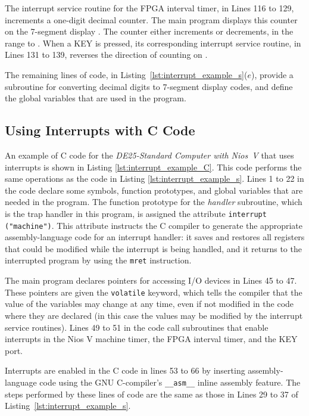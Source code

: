 \documentclass[11pt, twoside, pdftex]{article}
\newcommand{\systemNameFull}{DE25-Standard Computer with Nios~V}
\begin{document}
The interrupt service routine for the FPGA interval timer, in Lines 116 to 129,
increments a one-digit decimal counter. The main program displays this counter on the 
7-segment display . The counter either increments or decrements,
in the range  to .  When a KEY is pressed, its corresponding 
interrupt service routine, in Lines 131 to 139, reverses the direction of counting on . 

The remaining lines of code, in Listing~\ref{lst:interrupt_example_s}($e$),
provide a subroutine for converting decimal digits to 7-segment display codes,
and define the global variables that are used in the program.

\subsection{Using Interrupts with C Code}

An example of C code for the {\it \systemNameFull} that uses interrupts is shown in 
Listing \ref{lst:interrupt_example_C}. This code performs the same operations as
the code in Listing \ref{lst:interrupt_example_s}. Lines 1 to 22 in the code declare some symbols, 
function prototypes, and global variables that are needed in the program. The function
prototype for the {\it handler} subroutine, which is the trap handler in this program, is
assigned the attribute \texttt{interrupt ("machine")}. This attribute instructs the C compiler 
to generate the appropriate assembly-language code for an interrupt handler: it saves and 
restores all registers that could be modified while the interrupt is being handled, and it 
returns to the interrupted program by using the \texttt{mret} instruction. 

The main program declares pointers for accessing I/O devices in Lines 45 to 47. These
pointers are given the \texttt{volatile} keyword, which tells the compiler that the
value of the variables may change at any time, even if not modified in the code where
they are declared (in this case the values may be modified by the interrupt service routines). 
Lines 49 to 51 in the code call subroutines that enable interrupts in the Nios V machine
timer, the FPGA interval timer, and the KEY port. 

Interrupts are enabled in the C code in lines 53 to 66 by inserting assembly-language code 
using the GNU C-compiler's \texttt{\_\_asm\_\_} inline assembly feature. The steps performed by
these lines of code are the same as those in Lines 29 to 37 of 
Listing~\ref{lst:interrupt_example_s}.
\end{document}
